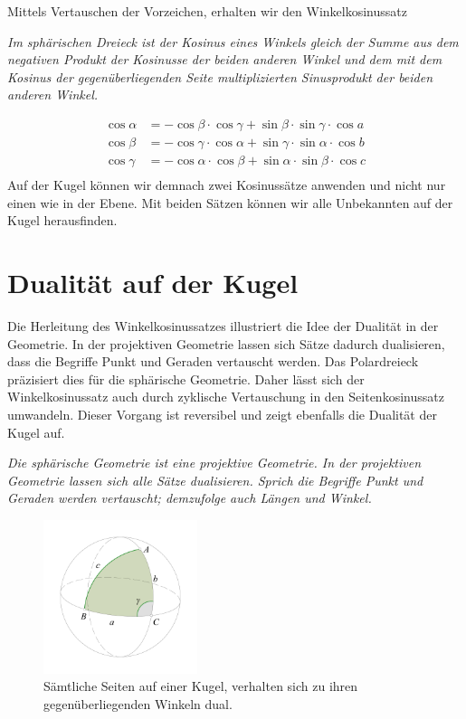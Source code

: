 \begin{refsection}
Mittels Vertauschen der Vorzeichen, erhalten wir den Winkelkosinussatz

\begin{satz}\textit{Im sphärischen Dreieck ist der Kosinus eines Winkels gleich der Summe aus dem negativen Produkt der Kosinusse der beiden anderen Winkel und dem mit dem Kosinus der gegenüberliegenden Seite multiplizierten Sinusprodukt der beiden anderen Winkel.}
\label{skript:kugel:satz:Winkelkosinussatz}
\end{satz}
\begin{align*}
{\cos \alpha} &= {-\cos \beta} \cdot {\cos \gamma} + {\sin \beta} \cdot {\sin \gamma} \cdot {\cos a}\\
{\cos \beta} &= {-\cos \gamma} \cdot {\cos \alpha} + {\sin \gamma} \cdot {\sin \alpha} \cdot {\cos b}\\
{\cos \gamma} &= {-\cos \alpha} \cdot {\cos \beta} + {\sin \alpha} \cdot {\sin \beta} \cdot {\cos c}\\
\end{align*}
Auf der Kugel können wir demnach zwei Kosinussätze anwenden und nicht nur einen wie in der Ebene. Mit beiden Sätzen können wir alle Unbekannten auf der Kugel herausfinden.



\section{Dualität auf der Kugel}
Die Herleitung des Winkelkosinussatzes illustriert die Idee der Dualität in der Geometrie. In der projektiven Geometrie lassen sich Sätze dadurch dualisieren, dass die Begriffe Punkt und Geraden vertauscht werden. Das Polardreieck präzisiert dies für die sphärische Geometrie.
Daher lässt sich der Winkelkosinussatz auch durch zyklische Vertauschung in den Seitenkosinussatz umwandeln. Dieser Vorgang ist reversibel und zeigt ebenfalls die Dualität der Kugel auf.

\begin{satz}\textit{Die sphärische Geometrie ist eine projektive Geometrie. In der projektiven Geometrie lassen sich alle Sätze dualisieren. Sprich die Begriffe Punkt und Geraden werden vertauscht; demzufolge auch Längen und Winkel.}
\label{skript:kugel:satz:Dualitaet}
\end{satz}

\begin{figure}[htbp]
\centering
\includegraphics[width=0.4\textwidth]{kugel/Dualitaet.jpg}
\caption{Sämtliche Seiten auf einer Kugel, verhalten sich zu ihren gegenüberliegenden Winkeln dual.}
\end{figure}



\end{refsection}
